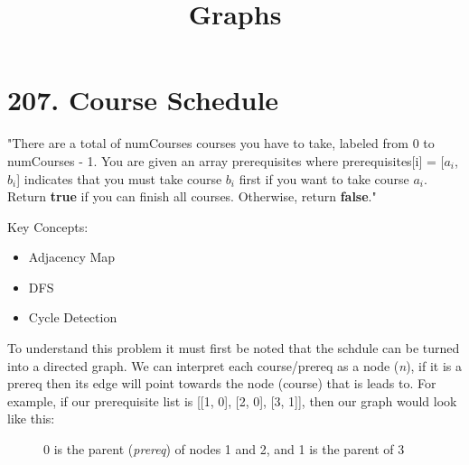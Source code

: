 \documentclass{article}
\begin{document}
\date{}
\title{Graphs}
\author{}
\maketitle
\graphicspath{{images/}} %
\section*{207. Course Schedule}
\begin{flushleft}
    "There are a total of numCourses courses you have to take, labeled from 0 to numCourses - 1. You are given an array prerequisites where prerequisites[i] = [$a_i$, $b_i$] indicates that you must take course $b_i$ first if you want to take course $a_i$.
    Return \textbf{true} if you can finish all courses. Otherwise, return \textbf{false}."
\end{flushleft}
Key Concepts:
\begin{itemize}
    \item Adjacency Map
    \item DFS
    \item Cycle Detection
\end{itemize}

\begin{flushleft}
    To understand this problem it must first be noted that the schdule can be turned into a directed graph.
    We can interpret each course/prereq as a node (\textit{n}), if it is a prereq then its edge will point towards the node (course) that is leads to.
    For example, if our prerequisite list is [[1, 0], [2, 0], [3, 1]], then our graph would look like this:
\end{flushleft}
\begin{figure}[H]
    \centering
    \caption{0 is the parent (\textit{prereq}) of nodes 1 and 2, and 1 is the parent of 3}
\end{figure}
\end{document}
